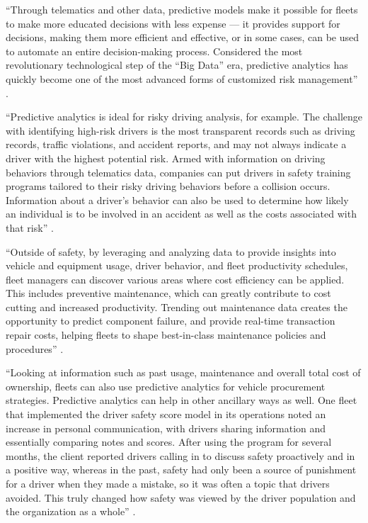 ``Through telematics and other data, predictive models make it possible for fleets to make more educated decisions with less expense — it provides support for decisions, making them more efficient and effective, or in some cases, can be used to automate an entire decision-making process. Considered the most revolutionary technological step of the “Big Data” era, predictive analytics has quickly become one of the most advanced forms of customized risk management'' \cite{Suizo2015decisions}.

``Predictive analytics is ideal for risky driving analysis, for example. The challenge with identifying high-risk drivers is the most transparent records such as driving records, traffic violations, and accident reports, and may not always indicate a driver with the highest potential risk. Armed with information on driving behaviors through telematics data, companies can put drivers in safety training programs tailored to their risky driving behaviors before a collision occurs. Information about a driver’s behavior can also be used to determine how likely an individual is to be involved in an accident as well as the costs associated with that risk'' \cite{Suizo2015decisions}.

``Outside of safety, by leveraging and analyzing data to provide insights into vehicle and equipment usage, driver behavior, and fleet productivity schedules, fleet managers can discover various areas where cost efficiency can be applied. This includes preventive maintenance, which can greatly contribute to cost cutting and increased productivity. Trending out maintenance data creates the opportunity to predict component failure, and provide real-time transaction repair costs, helping fleets to shape best-in-class maintenance policies and procedures'' \cite{Suizo2015decisions}.

``Looking at information such as past usage, maintenance and overall total cost of ownership, fleets can also use predictive analytics for vehicle procurement strategies. Predictive analytics can help in other ancillary ways as well. One fleet that implemented the driver safety score model in its operations noted an increase in personal communication, with drivers sharing information and essentially comparing notes and scores. After using the program for several months, the client reported drivers calling in to discuss safety proactively and in a positive way, whereas in the past, safety had only been a source of punishment for a driver when they made a mistake, so it was often a topic that drivers avoided. This truly changed how safety was viewed by the driver population and the organization as a whole'' \cite{Suizo2015decisions}.


